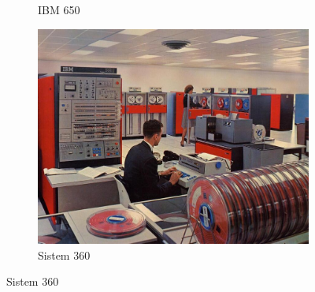 \documentclass{beamer}
\begin{document}
\begin{frame}[fragile]
\begin{figure}[htb]
\begin{subfigure}{0.25\textwidth}
  \caption{IBM 650}
  \label{fig:2}
\end{subfigure}\hfil
\begin{subfigure}{0.25\textwidth}
  \includegraphics[width=\linewidth]{sys360.jpg}
  \caption{Sistem 360}
  \label{fig:3}
\end{subfigure}


\end{figure}
\end{frame}
\end{document}
